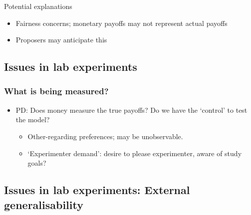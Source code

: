 \documentclass[]{article}
\providecommand{\tightlist}{%
  \setlength{\itemsep}{0pt}\setlength{\parskip}{0pt}}
\begin{document}
Potential explanations

\begin{itemize}
\tightlist
\item
  Fairness concerns; monetary payoffs may not represent actual payoffs
\item
  Proposers may anticipate this
\end{itemize}

\hypertarget{issues-in-lab-experiments}{%
\subsection{Issues in lab experiments}\label{issues-in-lab-experiments}}

\hypertarget{what-is-being-measured}{%
\subsubsection{What is being measured?}\label{what-is-being-measured}}

\begin{itemize}
\tightlist
\item
  PD: Does money measure the true payoffs? Do we have the `control' to
  test the model?

  \begin{itemize}
  \tightlist
  \item
    Other-regarding preferences; may be unobservable.
  \item
    `Experimenter demand': desire to please experimenter, aware of study
    goals?
  \end{itemize}
\end{itemize}

\hypertarget{issues-in-lab-experiments-external-generalisability}{%
\subsection{Issues in lab experiments: External
generalisability}\label{issues-in-lab-experiments-external-generalisability}}
\end{document}

